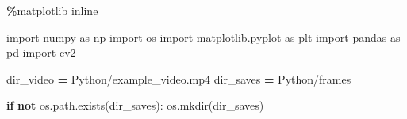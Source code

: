 \documentclass[
]{article}
\newenvironment{Shaded}{\begin{snugshade}}{\end{snugshade}}
\newcommand{\ControlFlowTok}[1]{\textcolor[rgb]{0.13,0.29,0.53}{\textbf{#1}}}
\newcommand{\ImportTok}[1]{#1}
\newcommand{\KeywordTok}[1]{\textcolor[rgb]{0.13,0.29,0.53}{\textbf{#1}}}
\newcommand{\NormalTok}[1]{#1}
\newcommand{\OperatorTok}[1]{\textcolor[rgb]{0.81,0.36,0.00}{\textbf{#1}}}
\newcommand{\StringTok}[1]{\textcolor[rgb]{0.31,0.60,0.02}{#1}}
\begin{document}
\begin{Shaded}
\begin{Highlighting}[]
\OperatorTok{\%}\NormalTok{matplotlib inline}
\end{Highlighting}
\end{Shaded}

\begin{Shaded}
\begin{Highlighting}[]
\ImportTok{import}\NormalTok{ numpy }\ImportTok{as}\NormalTok{ np}
\ImportTok{import}\NormalTok{ os}
\ImportTok{import}\NormalTok{ matplotlib.pyplot }\ImportTok{as}\NormalTok{ plt}
\ImportTok{import}\NormalTok{ pandas }\ImportTok{as}\NormalTok{ pd}
\ImportTok{import}\NormalTok{ cv2}
\end{Highlighting}
\end{Shaded}

\begin{Shaded}
\begin{Highlighting}[]
\NormalTok{dir\_video }\OperatorTok{=} \StringTok{\textquotesingle{}Python/example\_video.mp4\textquotesingle{}}
\NormalTok{dir\_saves }\OperatorTok{=} \StringTok{\textquotesingle{}Python/frames\textquotesingle{}}
\end{Highlighting}
\end{Shaded}

\begin{Shaded}
\begin{Highlighting}[]
\ControlFlowTok{if} \KeywordTok{not}\NormalTok{ os.path.exists(dir\_saves):}
\NormalTok{    os.mkdir(dir\_saves)}
\end{Highlighting}
\end{Shaded}
\end{document}
